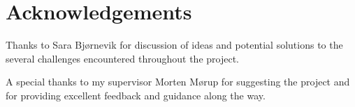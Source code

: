 \chapter{Acknowledgements}

Thanks to Sara Bjørnevik for discussion of ideas and potential solutions to the several challenges encountered throughout the project.

A special thanks to my supervisor Morten Mørup for suggesting the project and for providing excellent feedback and guidance along the way. 
